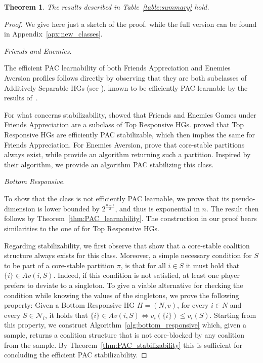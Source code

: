 \documentclass[letterpaper]{article} %
\newtheorem{theorem}{Theorem}[section]
\newcommand{\set}[1]{\{#1\}}
\newcommand{\proofpart}[1]{%
  \par
  \addvspace{\smallskipamount}%
  \noindent\emph{#1} \hspace{2pt}
}
\begin{document}
\begin{theorem}\label{thm:new_classes}
The results described in
Table~\ref{table:summary} hold.
\end{theorem}
\begin{proof}
We give here just a sketch of the proof.
while the full version can be found in Appendix~\ref{apx:new_classes}.
\proofpart{Friends and Enemies.}
The efficient PAC learnability of both Friends Appreciation and Enemies Aversion profiles follows directly by observing that they are both subclasses of Additively Separable HGs (see \cite{DimitrovBHS06}), known to be efficiently PAC learnable by the results of~\citet{SliwinskiZ17}.

For what concerns stabilizability, \citet{suzuki2010hedonic} showed that Friends and Enemies Games under Friends Appreciation are a subclass of Top Responsive HGs. \citet{SliwinskiZ17} proved that Top Responsive HGs are efficiently PAC stabilizable, which then implies the same for Friends Appreciation.
For Enemies Aversion, \citet{DimitrovBHS06} prove that core-stable partitions always exist, while \citet{DimitrovS04} provide an algorithm returning such a partition. Inspired by their algorithm, we provide an algorithm PAC stabilizing this class.

\proofpart{Bottom Responsive.}
To show that the class is not efficiently PAC learnable, we prove that its pseudo-dimension is lower bounded by $2^{\frac{n-1}{2}}$, and thus is exponential in $n$. The result then follows by Theorem~\ref{thm:PAC_learnability}. The construction in our proof bears similarities to the one of \citet{SliwinskiZ17} for Top Responsive HGs.

Regarding stabilizability, we first observe that \citet{suzuki2010hedonic} show that a core-stable coalition structure always exists for this class. Moreover, a simple necessary condition for $S$ to be part of a core-stable partition $\pi$, is that for all $i \in S$ it must hold that $\set{i} \in Av(i, S)$. Indeed, if this condition is not satisfied, at least one player prefers to deviate to a singleton. To give a viable alternative for checking the condition while knowing the values of the singletons, we prove the following property:
Given a Bottom Responsive HG $H=(N, v)$, for every $i\in N$ and every $S \in \mathcal{N}_i$, it holds that $
  \{ i \} \in Av(i, S) \iff  v_i(\set{i}) \leq v_i(S)$.
Starting from this property, we construct Algorithm~\ref{alg:bottom_responsive} which, given a sample, returns a coalition structure that is not core-blocked by any coalition from the sample. By Theorem~\ref{thm:PAC_stabilizability} this is sufficient for concluding the efficient PAC stabilizability.


\end{proof}
\end{document}
